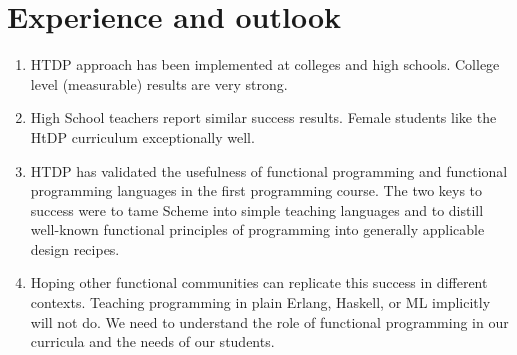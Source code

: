 \documentclass{article}
\begin{document}
\section{Experience and outlook}

\begin{enumerate}
\item HTDP approach has been implemented at colleges and high
  schools. College level (measurable) results are very strong.
\item High School teachers report similar success results. Female
  students like the HtDP curriculum exceptionally well.
\item HTDP has validated the usefulness of functional programming and
  functional programming languages in the first programming
  course. The two keys to success were to tame Scheme into simple
  teaching languages and to distill well-known functional principles
  of programming into generally applicable design recipes.
\item Hoping other functional communities can replicate this success
  in different contexts. Teaching programming in plain Erlang,
  Haskell, or ML implicitly will not do. We need to understand the
  role of functional programming in our curricula and the needs of our
  students.
\end{enumerate}






\end{document}
